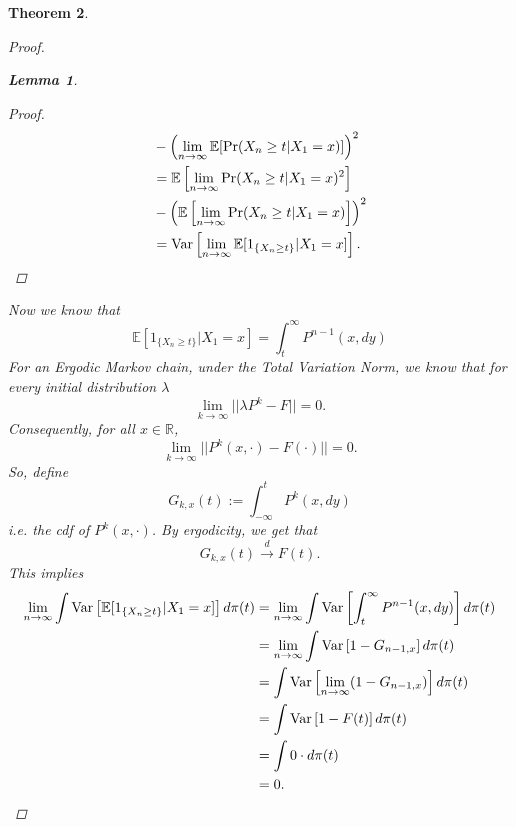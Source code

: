 \documentclass{article}
\newtheorem{theorem}{Theorem}[section]
\newtheorem{lemma}[theorem]{Lemma}
\begin{document}
\begin{theorem}
\begin{proof}
\begin{lemma}
\begin{proof}
\begin{align*}
						&- \left(\lim_{n \rightarrow \infty} \mathbb{E}[\Pr(X_{n} \geq t | X_{1} = x)]\right)^2\\
						&= \mathbb{E}\left[\lim_{n \rightarrow \infty} \Pr(X_{n} \geq t | X_{1} = x)^2\right]\\
						&- \left(\mathbb{E}\left[\lim_{n \rightarrow \infty}\Pr(X_{n} \geq t | X_{1} = x)\right]\right)^2\\
						&= \text{Var}\left[\lim_{n \rightarrow \infty} \mathbb{E}[1_{\{X_{n} \geq t\}}|X_1=x]\right].
					\end{align*}
				\end{proof}
			\end{lemma}
			Now we know that
			\begin{equation*}
				\mathbb{E}[1_{\{X_{n} \geq t\}}|X_1=x] = \int_t^{\infty} P^{n-1}(x, dy)
			\end{equation*}
			For an Ergodic Markov chain, under the Total Variation Norm, we know that for every initial distribution $\lambda$
			\begin{equation*}
				\lim_{k\rightarrow\infty}||\lambda P^k - F|| = 0.
			\end{equation*}
			Consequently, for all $x \in \mathbb{R}$,
			\begin{equation*}
				\lim_{k\rightarrow\infty}||P^k(x, \cdot) - F(\cdot)|| = 0.
			\end{equation*}
			So, define $$G_{k, x}(t) := \int_{-\infty}^{t} P^{k}(x, dy)$$
			i.e. the cdf of $P^k(x, \cdot)$. By ergodicity, we get that
			$$G_{k, x}(t) \xrightarrow{d} F(t).$$
			This implies
			\begin{align*}
				\lim_{n \rightarrow \infty} \int \text{Var}\left[\mathbb{E}[1_{\{X_{n} \geq t\}}|X_1=x]\right] d\pi(t) &= \lim_{n \rightarrow \infty} \int \text{Var}\left[\int_t^{\infty} P^{n-1}(x, dy)\right] d\pi(t)\\
				&= \lim_{n \rightarrow \infty} \int \text{Var}\left[1-G_{n-1, x}\right] d\pi(t)\\
				&= \int \text{Var}\left[\lim_{n \rightarrow \infty}(1-G_{n-1, x})\right] d\pi(t)\\
				&= \int \text{Var}\left[1-F(t)\right] d\pi(t)\\
				&= \int 0 \cdot d\pi(t)\\
				&= 0.
			\end{align*}
		\end{proof}
	\end{theorem}
\end{document}
